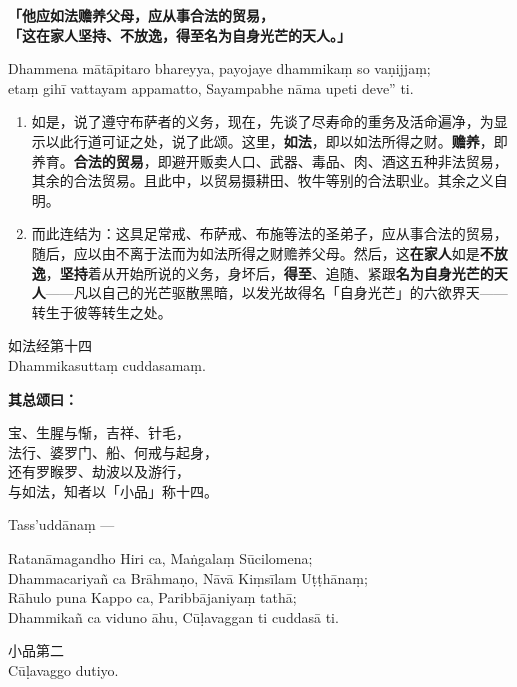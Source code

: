\textbf{「他应如法赡养父母，应从事合法的贸易，\\}
\textbf{「这在家人坚持、不放逸，得至名为自身光芒的天人。」}

Dhammena mātāpitaro bhareyya, payojaye dhammikaṃ so vaṇijjaṃ;\\
etaṃ gihī vattayam appamatto, Sayampabhe nāma upeti deve” ti. %

\begin{enumerate}\item 如是，说了遵守布萨者的义务，现在，先谈了尽寿命的重务及活命遍净，为显示以此行道可证之处，说了此颂。这里，\textbf{如法}，即以如法所得之财。\textbf{赡养}，即养育。\textbf{合法的贸易}，即避开贩卖人口、武器、毒品、肉、酒这五种非法贸易，其余的合法贸易。且此中，以贸易摄耕田、牧牛等别的合法职业。其余之义自明。
\item 而此连结为：这具足常戒、布萨戒、布施等法的圣弟子，应从事合法的贸易，随后，应以由不离于法而为如法所得之财赡养父母。然后，这\textbf{在家人}如是\textbf{不放逸}，\textbf{坚持}着从开始所说的义务，身坏后，\textbf{得至}、追随、紧跟\textbf{名为自身光芒的天人}——凡以自己的光芒驱散黑暗，以发光故得名「自身光芒」的六欲界天——转生于彼等转生之处。\end{enumerate}

\begin{center}\vspace{5em}如法经第十四\\Dhammikasuttaṃ cuddasamaṃ.\end{center}

\textbf{其总颂曰：}

\begin{quoting}宝、生腥与惭，吉祥、针毛，\\法行、婆罗门、船、何戒与起身，\\还有罗睺罗、劫波以及游行，\\与如法，知者以「小品」称十四。\end{quoting}

Tass’uddānaṃ —

\begin{quoting}Ratanāmagandho Hiri ca, Maṅgalaṃ Sūcilomena;\\Dhammacariyañ ca Brāhmaṇo, Nāvā Kiṃsīlam Uṭṭhānaṃ;\\Rāhulo puna Kappo ca, Paribbājaniyaṃ tathā;\\Dhammikañ ca viduno āhu, Cūḷavaggan ti cuddasā ti.\end{quoting}

\begin{center}\vspace{1em}小品第二\\Cūḷavaggo dutiyo.\end{center}

